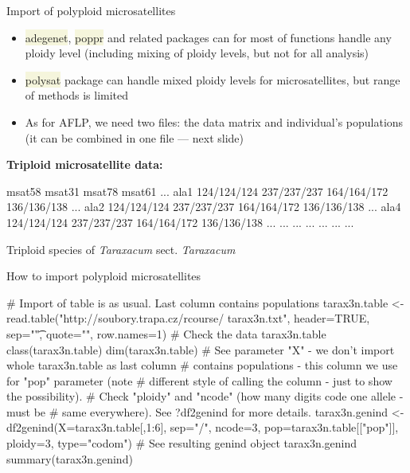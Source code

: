 \documentclass[compress, ucs, xelatex, 11pt, xcolor=svgnames, aspectratio=169,
	hyperref={
		bookmarks=true,
		unicode=true,
		colorlinks=true,
		pdftitle={Molecular data in R},
		plainpages=false,
		pdfauthor={Vojtech Zeisek},
		pdfsubject={Course about phylogeny and evolution in R},
		pdfcreator={XeLaTeX},
		pdfkeywords={R, evolution, phylogeny, molecular data},
		linkcolor=Crimson, %
		anchorcolor=Magenta, %
		citecolor=Magenta, %
		filecolor=Magenta, %
		menucolor=Magenta, %
		urlcolor=DodgerBlue, %
		pdftex},
	url={hyphens, lowtilde} %
	]{beamer}
\renewcommand{\texttt}[1]{\colorbox{Beige}{{\ttfamily #1}}}
\begin{document}
\begin{frame}[fragile]{Import of polyploid microsatellites}
	\vfill
	\begin{itemize}
		\item \texttt{adegenet}, \texttt{poppr} and related packages can for most of functions handle any ploidy level (including mixing of ploidy levels, but not for all analysis)
		\item \texttt{polysat} package can handle mixed ploidy levels for microsatellites, but range of methods is limited
		\item As for AFLP, we need two files: the data matrix and individual's populations (it can be combined in one file --- next slide)
	\end{itemize}
	\vfill
	\textbf{Triploid microsatellite data:}
	\vfil
	\begin{spluscode}
              msat58      msat31      msat78      msat61 ...
    ala1 124/124/124 237/237/237 164/164/172 136/136/138 ...
    ala2 124/124/124 237/237/237 164/164/172 136/136/138 ...
    ala4 124/124/124 237/237/237 164/164/172 136/136/138 ...
     ...         ...         ...         ...         ... ...
	\end{spluscode}
	\vfill
	\begin{footnotesize}
		Triploid species of \textit{Taraxacum} sect. \textit{Taraxacum}
	\end{footnotesize}
	\vfill
\end{frame}

\begin{frame}[fragile]{How to import polyploid microsatellites}
	\begin{spluscode}
    # Import of table is as usual. Last column contains populations
    tarax3n.table <- read.table("http://soubory.trapa.cz/rcourse/
      tarax3n.txt", header=TRUE, sep="\t", quote="", row.names=1)
    # Check the data
    tarax3n.table
    class(tarax3n.table)
    dim(tarax3n.table)
    # See parameter "X" - we don't import whole tarax3n.table as last column
    # contains populations - this column we use for "pop" parameter (note
    # different style of calling the column - just to show the possibility).
    # Check "ploidy" and "ncode" (how many digits code one allele - must be
    # same everywhere). See ?df2genind for more details.
    tarax3n.genind <- df2genind(X=tarax3n.table[,1:6], sep="/", ncode=3,
      pop=tarax3n.table[["pop"]], ploidy=3, type="codom")
    # See resulting genind object
    tarax3n.genind
    summary(tarax3n.genind)
	\end{spluscode}
\end{frame}
\end{document}
